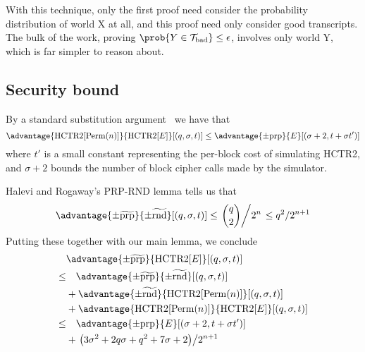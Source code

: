 \documentclass[hctr2.tex]{subfiles}
\begin{document}
With this technique, only the first proof
need consider the probability
distribution of world X at all,
and this proof need only consider good transcripts.
The bulk of the work, proving
\(\prob{Y \in \Tb} \leq \epsilon\),
involves only world Y, which is far simpler
to reason about.


\subsection{Security bound}\label{securitybound}
By a standard substitution argument~\cite{cbcsec,concrete} we have that
\begin{displaymath}
    \advantage{\HCTR[\Perm(n)]}{\HCTR[E]}[(q, \sigma, t)]
    \leq \advantage{\pm \mathrm{prp}}{E}[(\sigma + 2, t + \sigma t')]
\end{displaymath}
where \(t'\) is a small constant
representing the per-block cost of simulating HCTR2, and
\(\sigma + 2\) bounds the number of block cipher calls made by the simulator.

Halevi and Rogaway's PRP-RND lemma
\cite[Appendix C, Lemma 6]{cmc} tells us that
\begin{displaymath}
    \advantage{\pm \widetilde{\mathrm{prp}}}{\pm\widetilde{\mathrm{rnd}}}[(q, \sigma, t)] 
    \leq \left.\binom{q}{2}\middle/2^n\right.
    \leq q^2/2^{n+1}
\end{displaymath}
Putting these together with our main lemma, we conclude
\begin{align*}
    &\advantage{\pm \widetilde{\mathrm{prp}}}{\HCTR[E]}[(q, \sigma, t)] \\
    \leq & \quad \advantage{\pm \widetilde{\mathrm{prp}}}{\pm\widetilde{\mathrm{rnd}}}[(q, \sigma, t)] \\
    & + \advantage{\pm\widetilde{\mathrm{rnd}}}{\HCTR[\Perm(n)]}[(q, \sigma, t)] \\
    & + \advantage{\HCTR[\Perm(n)]}{\HCTR[E]}[(q, \sigma, t)] \\
    \leq & \quad \advantage{\pm \mathrm{prp}}{E}[(\sigma + 2, t + \sigma t')] \\
    &+ \left.\left(3\sigma^2 + 2q\sigma + q^2 + 7\sigma + 2\right)\middle/2^{n+1}\right.
\end{align*}
\end{document}
